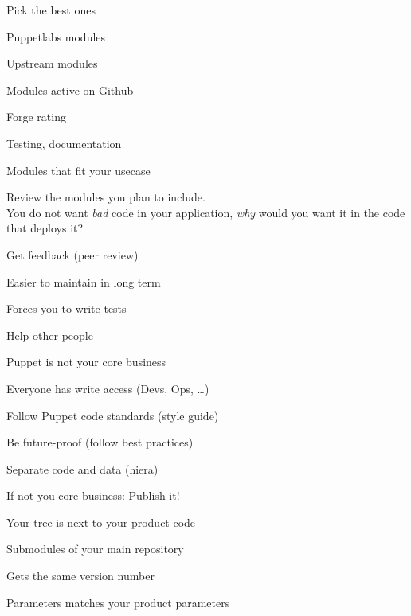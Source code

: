 
\begin{iframe}
\item Pick the best ones
\item Puppetlabs modules
\item Upstream modules
\item Modules active on Github
\item Forge rating
\item Testing, documentation
\item Modules that fit your usecase
\end{iframe}

\begin{frame}\LARGE Review the modules you plan to include.\pause\\You do not want \textit{bad} code in your application, \textit{why} would you want it in the code that deploys it?\end{frame}

\begin{iframe}
\item Get feedback (peer review)
\item Easier to maintain in long term
\item Forces you to write tests
\item Help other people
\item Puppet is not your core business
\end{iframe}


\begin{iframe}
\item Everyone has write access (Devs, Ops, \dots)
\item Follow Puppet code standards (style guide)
\item Be future-proof (follow best practices)
\item Separate code and data (hiera)
\item If not you core business: Publish it!
\end{iframe}

\begin{iframe}
\item Your tree is next to your product code
\item Submodules of your main repository
\item Gets the same version number
\item Parameters matches your product parameters
\end{iframe}

